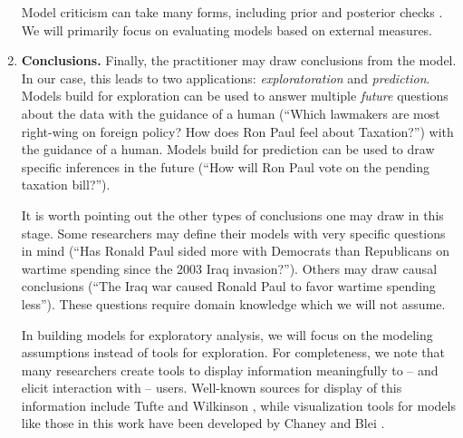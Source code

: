 \begin{enumerate}
    Model criticism can take many forms, including prior and posterior
    checks \cite{box:1980,gelman:1996}. We will primarily focus on
    evaluating models based on external measures.
  
  \item \textbf{Conclusions.} Finally, the practitioner may draw
    conclusions from the model.  In our case, this leads to two
    applications: \emph{exploratoration} and \emph{prediction}.
    Models build for exploration can be used to answer multiple
    \emph{future} questions about the data with the guidance of a
    human (``Which lawmakers are most right-wing on foreign policy?
    How does Ron Paul feel about Taxation?'') with the guidance of a
    human.  Models build for prediction can be used to draw specific
    inferences in the future (``How will Ron Paul vote on the pending
    taxation bill?'').

    It is worth pointing out the other types of conclusions one may
    draw in this stage. Some researchers may define their models with
    very specific questions in mind (``Has Ronald Paul sided more with
    Democrats than Republicans on wartime spending since the 2003 Iraq
    invasion?'').  Others may draw causal conclusions (``The Iraq war
    caused Ronald Paul to favor wartime spending less''). These
    questions require domain knowledge which we will not assume.

    In building models for exploratory analysis, we will focus on the
    modeling assumptions instead of tools for exploration.  For
    completeness, we note that many researchers create tools to
    display information meaningfully to -- and elicit interaction with
    -- users.  Well-known sources for display of this information
    include Tufte \cite{tufte:2001} and Wilkinson
    \cite{wilkinson:2005}, while visualization tools for models like
    those in this work have been developed by Chaney and Blei
    \cite{chaney:2012}.

\end{enumerate}

